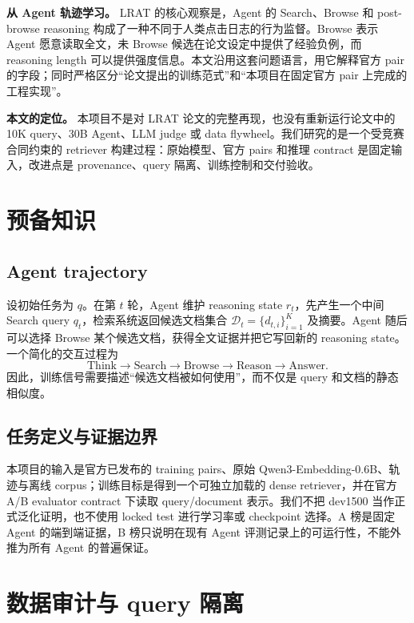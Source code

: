 \documentclass[UTF8,10pt,a4paper,twocolumn]{ctexart}
\begin{document}
\textbf{从 Agent 轨迹学习。}
LRAT 的核心观察是，Agent 的 Search、Browse 和 post-browse reasoning 构成了一种不同于人类点击日志的行为监督。Browse 表示 Agent 愿意读取全文，未 Browse 候选在论文设定中提供了经验负例，而 reasoning length 可以提供强度信息。本文沿用这套问题语言，用它解释官方 pair 的字段；同时严格区分“论文提出的训练范式”和“本项目在固定官方 pair 上完成的工程实现”。

\textbf{本文的定位。}
本项目不是对 LRAT 论文的完整再现，也没有重新运行论文中的 10K query、30B Agent、LLM judge 或 data flywheel。我们研究的是一个受竞赛合同约束的 retriever 构建过程：原始模型、官方 pairs 和推理 contract 是固定输入，改进点是 provenance、query 隔离、训练控制和交付验收。

\section{预备知识}

\subsection{Agent trajectory}

设初始任务为 $q$。在第 $t$ 轮，Agent 维护 reasoning state $r_t$，先产生一个中间 Search query $q_t$，检索系统返回候选文档集合 $\mathcal{D}_t=\{d_{t,i}\}_{i=1}^{K}$ 及摘要。Agent 随后可以选择 Browse 某个候选文档，获得全文证据并把它写回新的 reasoning state。一个简化的交互过程为
\[
\text{Think}\rightarrow\text{Search}\rightarrow\text{Browse}\rightarrow\text{Reason}\rightarrow\text{Answer}.
\]
因此，训练信号需要描述“候选文档被如何使用”，而不仅是 query 和文档的静态相似度。

\subsection{任务定义与证据边界}

本项目的输入是官方已发布的 training pairs、原始 Qwen3-Embedding-0.6B、轨迹与离线 corpus；训练目标是得到一个可独立加载的 dense retriever，并在官方 A/B evaluator contract 下读取 query/document 表示。我们不把 dev1500 当作正式泛化证明，也不使用 locked test 进行学习率或 checkpoint 选择。A 榜是固定 Agent 的端到端证据，B 榜只说明在现有 Agent 评测记录上的可运行性，不能外推为所有 Agent 的普遍保证。

\section{数据审计与 query 隔离}
\end{document}
